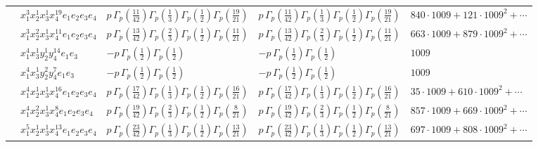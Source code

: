 \documentclass[11pt]{article}
\begin{document}
\begin{table}[ht]
{\begin{tabular}{@{}lllll@{}}
 & $x_{1}^{3} x_{2}^{1} x_{3}^{1} x_{4}^{19}  e_{1} e_{2} e_{3} e_{4}$ & $p \, \Gamma_p \left( \frac{11}{42} \right) \Gamma_p \left( \frac{1}{3} \right) \Gamma_p \left( \frac{1}{2} \right) \Gamma_p \left( \frac{19}{21} \right)$ & $p \, \Gamma_p \left( \frac{11}{42} \right) \Gamma_p \left( \frac{1}{3} \right) \Gamma_p \left( \frac{1}{2} \right) \Gamma_p \left( \frac{19}{21} \right)$ & $840{\cdot}1009{+}121{\cdot}1009^{2}{+}\cdots$ \\
 & $x_{1}^{3} x_{2}^{2} x_{3}^{1} x_{4}^{11}  e_{1} e_{2} e_{3} e_{4}$ & $p \, \Gamma_p \left( \frac{13}{42} \right) \Gamma_p \left( \frac{2}{3} \right) \Gamma_p \left( \frac{1}{2} \right) \Gamma_p \left( \frac{11}{21} \right)$ & $p \, \Gamma_p \left( \frac{13}{42} \right) \Gamma_p \left( \frac{2}{3} \right) \Gamma_p \left( \frac{1}{2} \right) \Gamma_p \left( \frac{11}{21} \right)$ & $663{\cdot}1009{+}879{\cdot}1009^{2}{+}\cdots$ \\
 & $x_{1}^{4} x_{3}^{1} y_{2}^{1} y_{4}^{14} e_{1} e_{3}$ & $- p \, \Gamma_p \left( \frac{1}{2} \right) \Gamma_p \left( \frac{1}{2} \right)$ & $- p \, \Gamma_p \left( \frac{1}{2} \right) \Gamma_p \left( \frac{1}{2} \right)$ & $1009$ \\
 & $x_{1}^{4} x_{3}^{1} y_{2}^{2} y_{4}^{7} e_{1} e_{3}$ & $- p \, \Gamma_p \left( \frac{1}{2} \right) \Gamma_p \left( \frac{1}{2} \right)$ & $- p \, \Gamma_p \left( \frac{1}{2} \right) \Gamma_p \left( \frac{1}{2} \right)$ & $1009$ \\
 & $x_{1}^{4} x_{2}^{1} x_{3}^{1} x_{4}^{16}  e_{1} e_{2} e_{3} e_{4}$ & $p \, \Gamma_p \left( \frac{17}{42} \right) \Gamma_p \left( \frac{1}{3} \right) \Gamma_p \left( \frac{1}{2} \right) \Gamma_p \left( \frac{16}{21} \right)$ & $p \, \Gamma_p \left( \frac{17}{42} \right) \Gamma_p \left( \frac{1}{3} \right) \Gamma_p \left( \frac{1}{2} \right) \Gamma_p \left( \frac{16}{21} \right)$ & $35{\cdot}1009{+}610{\cdot}1009^{2}{+}\cdots$ \\
 & $x_{1}^{4} x_{2}^{2} x_{3}^{1} x_{4}^{8}  e_{1} e_{2} e_{3} e_{4}$ & $p \, \Gamma_p \left( \frac{19}{42} \right) \Gamma_p \left( \frac{2}{3} \right) \Gamma_p \left( \frac{1}{2} \right) \Gamma_p \left( \frac{8}{21} \right)$ & $p \, \Gamma_p \left( \frac{19}{42} \right) \Gamma_p \left( \frac{2}{3} \right) \Gamma_p \left( \frac{1}{2} \right) \Gamma_p \left( \frac{8}{21} \right)$ & $857{\cdot}1009{+}669{\cdot}1009^{2}{+}\cdots$ \\
 & $x_{1}^{5} x_{2}^{1} x_{3}^{1} x_{4}^{13}  e_{1} e_{2} e_{3} e_{4}$ & $p \, \Gamma_p \left( \frac{23}{42} \right) \Gamma_p \left( \frac{1}{3} \right) \Gamma_p \left( \frac{1}{2} \right) \Gamma_p \left( \frac{13}{21} \right)$ & $p \, \Gamma_p \left( \frac{23}{42} \right) \Gamma_p \left( \frac{1}{3} \right) \Gamma_p \left( \frac{1}{2} \right) \Gamma_p \left( \frac{13}{21} \right)$ & $697{\cdot}1009{+}808{\cdot}1009^{2}{+}\cdots$ \\

\end{tabular}}
\end{table}
\end{document}
